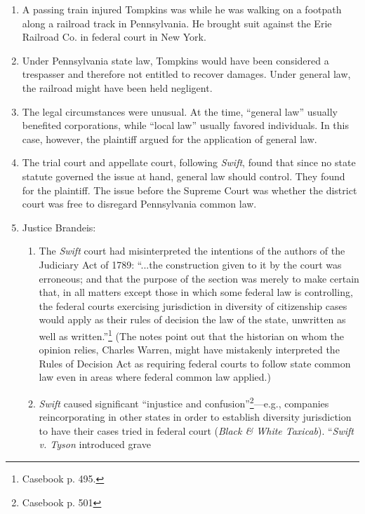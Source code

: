 \begin{enumerate}
    \item A passing train injured Tompkins was while he was 
    walking on a footpath along a railroad track in Pennsylvania. He brought 
    suit against the Erie Railroad Co. in federal court in New York.
    \item Under Pennsylvania state law, 
    Tompkins would have been considered a trespasser and therefore not 
    entitled to recover damages. Under general law, the railroad might have 
    been held negligent.
    \item The legal circumstances were unusual. At the time, ``general law'' 
    usually benefited corporations, while ``local law'' usually favored 
    individuals. In this case, however, the plaintiff argued for the 
    application of general law.
    \item The trial court and appellate court, following \emph{Swift}, found 
    that since no state statute governed the issue at hand, general law should 
    control. They found for the plaintiff. The issue before the Supreme Court 
    was whether the district court was free to disregard Pennsylvania common 
    law.
    \item Justice Brandeis:
    \begin{enumerate}
        \item The \emph{Swift} court had misinterpreted the intentions 
        of the authors of the Judiciary Act of 1789: ``...the construction 
        given to it by the court was erroneous; and that the purpose of the 
        section was merely to make certain that, in all matters except those 
        in which some federal law is controlling, the federal courts 
        exercising jurisdiction in diversity of citizenship cases would apply 
        as their rules of decision the law of the state, unwritten as well as 
        written.''\footnote{Casebook p. 495.} (The notes point out that the historian on whom the opinion 
        relies, Charles Warren, might have mistakenly interpreted the Rules of 
        Decision Act as requiring federal courts to follow state common law 
        even in areas where federal common law applied.)
        \item \emph{Swift} caused significant ``injustice and 
        confusion''\footnote{Casebook p. 501}---e.g., companies 
        reincorporating in other states in order to establish diversity 
        jurisdiction to have their cases tried in federal court (\emph{Black 
        \& White Taxicab}). ``\emph{Swift v. Tyson} introduced grave 

\end{enumerate}
\end{enumerate}
